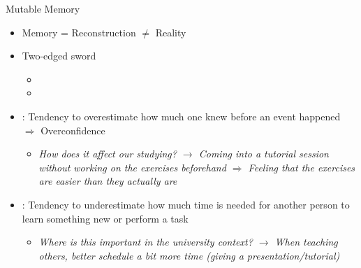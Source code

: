 \documentclass{ercisbeamer}
\begin{document}
\begin{frame}{Mutable Memory}
    \pause
    \begin{tbox}
        \begin{itemize}
            \item Memory = Reconstruction $\ne$ Reality
            \item Two-edged sword
            \begin{itemize}
                \item {} 
                \item {}
            \end{itemize}
            \item {}: Tendency to overestimate how much one knew before an event happened $\Rightarrow$ Overconfidence
            \begin{itemize}
                \item \emph{How does it affect our studying? \pause $\rightarrow$ Coming into a tutorial session without working on the exercises beforehand $\Rightarrow$ Feeling that the exercises are easier than they actually are}
            \end{itemize}
            \item {}: Tendency to underestimate how much time is needed for another person to learn something new or perform a task
            \begin{itemize}
                \item \emph{Where is this important in the university context? \pause $\rightarrow$ When teaching others, better schedule a bit more time (giving a presentation/tutorial)}
            \end{itemize}
        \end{itemize}     
    \end{tbox}
\end{frame}
\setbgimage{}
\end{document}
